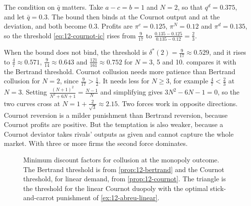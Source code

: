 The condition on $\bar q$ matters. Take $a - c = b = 1$ and $N = 2$, so that $q^d = 0.375$, and let $\bar q = 0.3$.
The bound then binds at the Cournot output and at the deviation, and both become $0.3$. Profits are
$\pi^c = 0.125$, $\pi^N = 0.12$ and $\pi^d = 0.135$, so the threshold \eqref{eq:12-cournot-ic} rises from
$\frac{9}{17}$ to $\frac{0.135 - 0.125}{0.135 - 0.12} = \frac{2}{3}$.

When the bound does not bind, the threshold is $\delta^*(2) = \frac{9}{17} \approx 0.529$, and it rises to $\frac{4}{7} \approx 0.571$,
$\frac{9}{14} \approx 0.643$ and $\frac{121}{161} \approx 0.752$ for $N = 3$, 5 and 10. 
compares it with the Bertrand threshold. Cournot collusion needs more patience than Bertrand collusion for $N = 2$,
since $\frac{9}{17} > \frac{1}{2}$. It needs less for $N \ge 3$, for example $\frac{4}{7} < \frac{2}{3}$ at $N = 3$.
Setting $\frac{(N + 1)^2}{N^2 + 6N + 1} = \frac{N - 1}{N}$ and simplifying gives $3N^2 - 6N - 1 = 0$, so the two
curves cross at $N = 1 + \frac{2}{\sqrt 3} \approx 2.15$. Two forces work in opposite directions. Cournot reversion
is a milder punishment than Bertrand reversion, because Cournot profits are positive. But the temptation is also
weaker, because a Cournot deviator takes rivals' outputs as given and cannot capture the whole market. With three or
more firms the second force dominates.

\begin{figure}[htbp]
\centering
{}
\caption{Minimum discount factors for collusion at the monopoly outcome. The Bertrand threshold is from
\cref{prop:12-bertrand} and the Cournot threshold, for linear demand, from \cref{prop:12-cournot}. The triangle is the
threshold for the linear Cournot duopoly with the optimal stick-and-carrot punishment of \cref{ex:12-abreu-linear}.}
\label{fig:12-critical-delta}
\end{figure}

